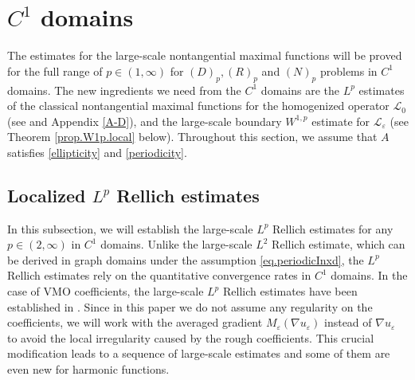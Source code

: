 \documentclass[reqno,12pt]{amsart} %
\theoremstyle{definition}
\theoremstyle{remark}
\numberwithin{equation}{section}
\newcommand{\cL}{\mathcal{L}}
\newcommand{\e}{\varepsilon}
\begin{document}

\section{$C^1$ domains}\label{sec.C1}

The estimates for the large-scale nontangential maximal functions will be proved for the full range of $p\in (1,\infty)$ for $(D)_p, (R)_p$ and $(N)_p$ problems in $C^1$ domains. The new ingredients we need from the $C^1$ domains are the $L^p$ estimates of the classical nontangential maximal functions for the homogenized operator $\cL_0$ (see \cite{Fabes1978} and  Appendix \ref{A-D}), and the large-scale boundary $W^{1,p}$ estimate for $\cL_\e$ (see Theorem \ref{prop.W1p.local} below). Throughout this section, we assume that $A$ satisfies \eqref{ellipticity} and \eqref{periodicity}.

\subsection{Localized $L^p$ Rellich estimates}
In this subsection, we will establish the large-scale $L^p$ Rellich estimates for any $p\in (2,\infty)$ in $C^1$ domains. Unlike the large-scale $L^2$ Rellich estimate, which can be derived in graph domains under the assumption \eqref{eq.periodicInxd}, the $L^p$ Rellich estimates rely on the quantitative convergence rates in $C^1$ domains. In the case of VMO coefficients, the large-scale $L^p$ Rellich estimates have been established in \cite{Shen17}. Since in this paper we do not assume any regularity on the coefficients, we will work with the averaged gradient $M_\e(\nabla u_\e)$ instead of $\nabla u_\e$ to avoid the local irregularity caused by the rough coefficients. This crucial modification leads to a sequence of large-scale estimates and some of them are even new for harmonic functions.

\end{document}
